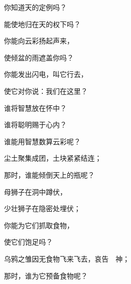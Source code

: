 {\par }{\Q {}你知道天的定例吗？
\par }{\Q 能使地归在天的权下吗？
\par }{\BB \par }{\Q {}你能向云彩扬起声来，
\par }{\Q 使倾盆的雨遮盖你吗？
\par }{\Q {}你能发出闪电，叫它行去，
\par }{\Q 使它对你说：我们在这里？
\par }{\Q {}谁将智慧放在怀中？
\par }{\Q 谁将聪明赐于心内？
\par }{\Q {}谁能用智慧数算云彩呢？
\par }{\Q 尘土聚集成团，土块紧紧结连；
\par }{\Q 那时，谁能倾倒天上的瓶呢？
\par }{\BB \par }{\Q {}母狮子在洞中蹲伏，
\par }{\Q 少壮狮子在隐密处埋伏；
\par }{\Q 你能为它们抓取食物，
\par }{\Q 使它们饱足吗？
\par }{\Q {}乌鸦之雏因无食物飞来飞去，哀告　神；
\par }{\Q 那时，谁为它预备食物呢？

}
